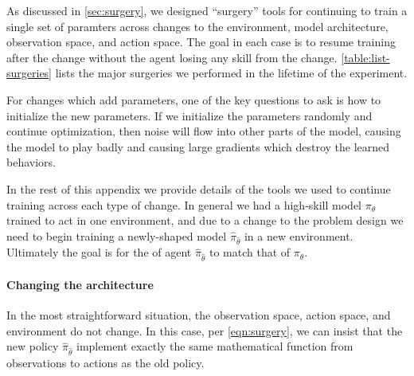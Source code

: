 \documentclass[ocean-paper.tex]{subfiles}
\begin{document}
\begin{table}
\caption{All successful surgeries and major environment changes performed during the training of \openaifive. This table does not include surgeries which were ultimately reverted due to training failures, nor minor environment changes (such as improvements to partial reward weights or scripted logic). ``Obs'' indicates than a new observation was added as an input to the model or an existing one was changed. ``Action'' indicates that a new game action was made available, along with appropriate observations about the state of that action. ``Item'' indicates that a new item was introduced, including observation of the item and the action to use the item. The \dota version updates (7.19, 7.20 and 7.21) include many new items, actions, and observations.}
\label{table:list-surgeries}
\end{table}

As discussed in \ref{sec:surgery}, we designed ``surgery'' tools for continuing to train a single set of paramters across changes to the environment, model architecture, observation space, and action space. 
The goal in each case is to resume training after the change without the agent losing any skill from the change. 
\autoref{table:list-surgeries} lists the major surgeries we performed in the lifetime of the \openaifive experiment.

For changes which add parameters, one of the key questions to ask is how to initialize the new parameters. If we initialize the parameters randomly and continue optimization, then noise will flow into other parts of the model, causing the model to play badly and causing large gradients which destroy the learned behaviors. 

In the rest of this appendix we provide details of the tools we used to continue training across each type of change. 
In general we had a high-skill model $\pi_\theta$ trained to act in one environment, and due to a change to the problem design we need to begin training a newly-shaped model $\hat{\pi}_{\hat\theta}$ in a new environment. 
Ultimately the goal is for the \trueskillname of agent $\hat{\pi}_{\hat\theta}$ to match that of $\pi_\theta$.

\paragraph{Changing the architecture}
In the most straightforward situation, the observation space, action space, and environment do not change.
In this case, per \autoref{eqn:surgery}, we can insist that the new policy $\hat\pi_{\hat\theta}$ implement exactly the same mathematical function from observations to actions as the old policy.
\end{document}

